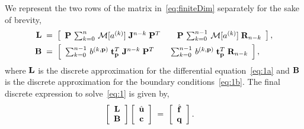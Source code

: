 \documentclass[%
secnumarabic,%
 amssymb, amsmath,%
 aps,prf,superscriptaddress,longbibliography
frontmatterverbose,
]{revtex4-2}
\begin{document}
We represent the two rows of the matrix in~\eqref{eq:finiteDim} separately for the sake of brevity,
\begin{align}
  \mathbf{L} \;&=\; \left[\begin{array}{ccc}
    \mathbf{P}\,\sum_{k = 0}^{n}\, \mathcal M [a^{(k)}]\; \mathbf J^{n-k}\;\mathbf{P}^T &  &\mathbf{P}\,\sum_{k = 0}^{n - 1}\,\mathcal M [a^{(k)}]\; \mathbf R_{n-k}
  \end{array}\right],\\
  \mathbf{B} \;&=\; \left[\begin{array}{ccc}
    \sum_{k = 0}^{n-1}\,b^{(k,\mathbf p)}\;\mathbf t^T_ {\mathbf p}\;\mathbf J^{n-k}\;\mathbf{P}^T & & \sum_{k = 0}^{n-1}\, b^{(k,\mathbf p)}\;\mathbf t^T_{\mathbf p}\;\mathbf R_{n-k} 
  \end{array}\right],\label{eq:bcRow}
\end{align}
where $\mathbf{L}$ is the discrete approximation for the differential equation~\eqref{eq:1a} and $\mathbf{B}$ is the discrete approximation for the boundary conditions~\eqref{eq:1b}.
The final discrete expression to solve~\eqref{eq:1} is given by,
\begin{align}\label{eq:Final}
  \left[\begin{array}{c}
    \mathbf{L}\\
    \mathbf{B}
  \end{array}\right]\left[\begin{array}{c}
    \hat{\mathbf{u}}\\
    \mathbf{c}
  \end{array}\right] \;&=\; \left[\begin{array}{c}
    \hat{\mathbf{f}}\\
    \mathbf{q}
  \end{array}\right].
\end{align}
\end{document}
